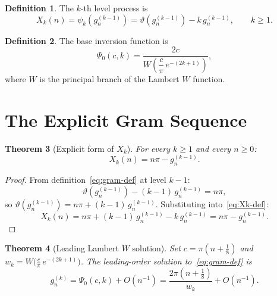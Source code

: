 \documentclass[11pt]{article}
\newtheorem{theorem}{Theorem}[section]
\theoremstyle{definition}
\newtheorem{definition}[theorem]{Definition}
\begin{document}
\begin{definition}
The $k$-th level process is
\begin{equation}
  X_k(n) = \psi_k\!\left(g_n^{(k-1)}\right)
          = \vartheta\!\left(g_n^{(k-1)}\right) - k\,g_n^{(k-1)},
  \qquad k \ge 1.
  \label{eq:Xk-def}
\end{equation}
\end{definition}

\begin{definition}
The base inversion function is
\begin{equation}
  \Psi_0(c, k) = \frac{2c}{W\!\left(\dfrac{c}{\pi}\,e^{-(2k+1)}\right)},
  \label{eq:Psi0}
\end{equation}
where $W$ is the principal branch of the Lambert $W$ function.
\end{definition}

\section{The Explicit Gram Sequence}

\begin{theorem}[Explicit form of $X_k$]
For every $k \ge 1$ and every $n \ge 0$:
\begin{equation}
  X_k(n) = n\pi - g_n^{(k-1)}.
  \label{eq:Xk-explicit}
\end{equation}
\end{theorem}

\begin{proof}
From definition~\eqref{eq:gram-def} at level $k-1$:
\begin{equation}
  \vartheta\!\left(g_n^{(k-1)}\right) - (k-1)\,g_n^{(k-1)} = n\pi,
\end{equation}
so $\vartheta(g_n^{(k-1)}) = n\pi + (k-1)\,g_n^{(k-1)}$.
Substituting into~\eqref{eq:Xk-def}:
\begin{equation}
  X_k(n) = n\pi + (k-1)\,g_n^{(k-1)} - k\,g_n^{(k-1)} = n\pi - g_n^{(k-1)}.
\end{equation}
\end{proof}

\begin{theorem}[Leading Lambert $W$ solution]
\label{thm:leading}
Set $c = \pi(n + \tfrac{1}{8})$ and $w_k = W\!\bigl(\frac{c}{\pi}\,e^{-(2k+1)}\bigr)$.
The leading-order solution to~\eqref{eq:gram-def} is
\begin{equation}
  g_n^{(k)} = \Psi_0(c, k) + O\!\left(n^{-1}\right)
             = \frac{2\pi\!\left(n + \tfrac{1}{8}\right)}{w_k}
               + O\!\left(n^{-1}\right).
  \label{eq:leading}
\end{equation}
\end{theorem}
\end{document}
